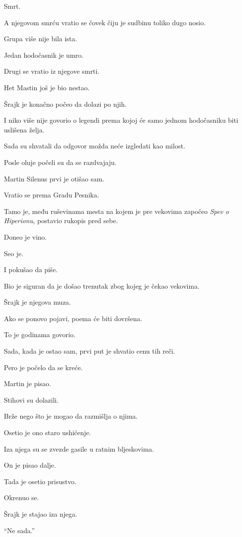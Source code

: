 Smrt.

A njegovom smrću vratio se čovek čiju je sudbinu toliko dugo nosio.

\bigskip

Grupa više nije bila ista.

Jedan hodočasnik je umro.

Drugi se vratio iz njegove smrti.

Het Mastin još je bio nestao.

Šrajk je konačno počeo da dolazi po njih.

I niko više nije govorio o legendi prema kojoj će samo jednom hodočasniku biti uslišena želja.

Sada su shvatali da odgovor možda neće izgledati kao milost.

\bigskip

Posle oluje počeli su da se razdvajaju.

Martin Silenus prvi je otišao sam.

Vratio se prema Gradu Pesnika.

Tamo je, među ruševinama mesta na kojem je pre vekovima započeo \emph{Spev o Hiperionu}, postavio rukopis pred sebe.

Doneo je vino.

Seo je.

I pokušao da piše.

Bio je siguran da je došao trenutak zbog kojeg je čekao vekovima.

Šrajk je njegova muza.

Ako se ponovo pojavi, poema će biti dovršena.

To je godinama govorio.

Sada, kada je ostao sam, prvi put je shvatio cenu tih reči.

\bigskip

Pero je počelo da se kreće.

Martin je pisao.

Stihovi su dolazili.

Brže nego što je mogao da razmišlja o njima.

Osetio je ono staro ushićenje.

Iza njega su se zvezde gasile u ratnim bljeskovima.

On je pisao dalje.

Tada je osetio prisustvo.

Okrenuo se.

Šrajk je stajao iza njega.

``Ne sada.''

